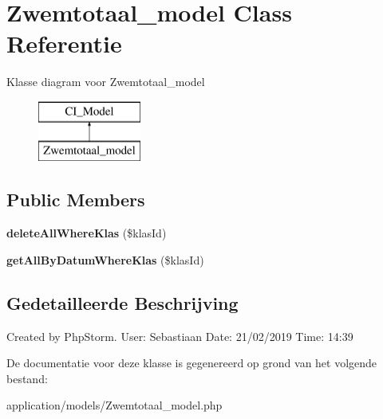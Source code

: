 \hypertarget{class_zwemtotaal__model}{}\section{Zwemtotaal\+\_\+model Class Referentie}
\label{class_zwemtotaal__model}
Klasse diagram voor Zwemtotaal\+\_\+model\begin{figure}[H]
\begin{center}
\leavevmode
\includegraphics[height=2.000000cm]{class_zwemtotaal__model}
\end{center}
\end{figure}
\subsection*{Public Members}
\begin{DoxyCompactItemize}
\item 
\mbox{\label{class_zwemtotaal__model_adbacd6d3157f77e31653a6e04133c6e3}} 
{\bfseries delete\+All\+Where\+Klas} (\$klas\+Id)
\item 
\mbox{\label{class_zwemtotaal__model_a4a724f8b9f95c56996ace3cdb550fdfb}} 
{\bfseries get\+All\+By\+Datum\+Where\+Klas} (\$klas\+Id)
\end{DoxyCompactItemize}


\subsection{Gedetailleerde Beschrijving}
Created by Php\+Storm. User\+: Sebastiaan Date\+: 21/02/2019 Time\+: 14\+:39 

De documentatie voor deze klasse is gegenereerd op grond van het volgende bestand\+:\begin{DoxyCompactItemize}
\item 
application/models/Zwemtotaal\+\_\+model.\+php\end{DoxyCompactItemize}
